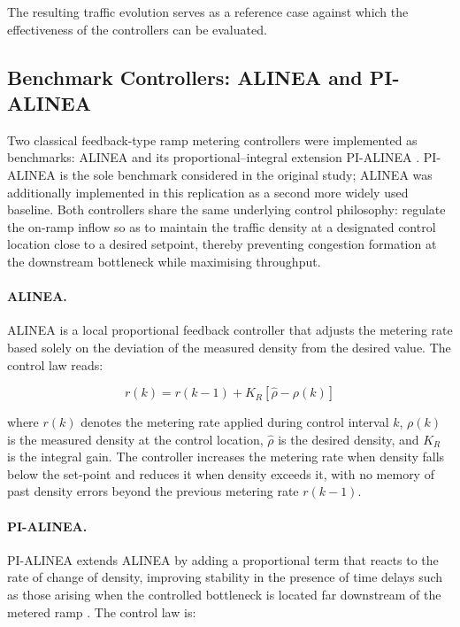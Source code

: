 The resulting traffic evolution serves as a reference case against which the effectiveness of the controllers can be evaluated.



\subsection{Benchmark Controllers: ALINEA and PI-ALINEA}

Two classical feedback-type ramp metering controllers were implemented as
benchmarks: ALINEA \citep{ALINEA} and its proportional--integral extension
PI-ALINEA \citep{PI-ALINEA}. PI-ALINEA is the sole benchmark considered in
the original study; ALINEA was additionally implemented in this replication
as a second more widely used baseline. Both controllers share the same
underlying control philosophy: regulate the on-ramp inflow so as to maintain
the traffic density at a designated control location close to a desired
setpoint, thereby preventing congestion formation at the downstream bottleneck
while maximising throughput.

\paragraph{ALINEA.}

ALINEA is a local proportional feedback controller that adjusts the metering
rate based solely on the deviation of the measured density from the desired
value. The control law reads:

\begin{equation}
    r(k) = r(k-1) + K_R\!\left[\hat{\rho} - \rho(k)\right]
\end{equation}

where $r(k)$ denotes the metering rate applied during control interval $k$,
$\rho(k)$ is the measured density at the control location, $\hat{\rho}$ is
the desired density, and $K_R$ is the integral gain. The controller increases
the metering rate when density falls below the set-point and reduces it when
density exceeds it, with no memory of past density errors beyond the previous
metering rate $r(k-1)$.

\paragraph{PI-ALINEA.}

PI-ALINEA extends ALINEA by adding a proportional term that reacts to the
rate of change of density, improving stability in the presence of time delays
such as those arising when the controlled bottleneck is located far downstream
of the metered ramp \citep{PI-ALINEA}. The control law is:

